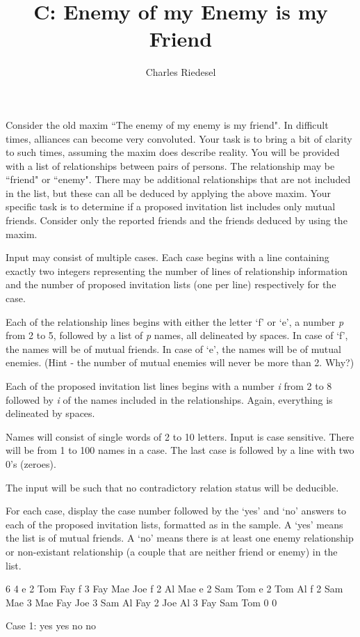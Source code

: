 \documentclass{article}
\title{C: Enemy of my Enemy is my Friend}
\author{Charles Riedesel}
\begin{document}
\begin{problemDescription}
Consider the old maxim ``The enemy of my enemy is my friend".  In difficult times,
alliances can become very convoluted.  Your task is to bring a bit of clarity to
such times, assuming the maxim does describe reality.  You will be provided with
a list of relationships between pairs of persons.  The relationship may be ``friend"
or ``enemy".  There may be additional relationships that are not included in
the list, but these can all be deduced by applying the above maxim.  Your specific
task is to determine if a proposed invitation list includes only mutual friends.
Consider only the reported friends and the friends deduced by using the maxim.
\end{problemDescription}

\begin{inputDescription}
Input may consist of multiple cases.  Each case begins with a line containing 
exactly two integers representing the number of lines of relationship information 
and the number of proposed invitation lists (one per line) respectively for the case.  

Each of the relationship lines begins with either the letter `f' or `e', a number {\em p} 
from 2 to 5, followed by a list of {\em p} names, all delineated by spaces.  In 
case of `f', the names will be of mutual friends.  In case of `e', the names will 
be of mutual enemies.  (Hint - the number of mutual enemies will never be more 
than 2.  Why?)

Each of the proposed invitation list lines begins with a number {\em i} from 2 to 8
followed by {\em i} of the names included in the relationships.
Again, everything is delineated by spaces.

Names will consist of single words of 2 to 10 letters.  Input is case sensitive.
There will be from 1 to 100 names in a case.  The last case is followed by a line
with two 0's (zeroes).

The input will be such that no contradictory relation status will be deducible.
\end{inputDescription}

\begin{outputDescription}
For each case, display the case number followed by the `yes' and `no' answers to 
each of the proposed invitation lists, formatted as in the sample.  A `yes' means
the list is of mutual friends.  A `no' means there is at least one enemy 
relationship or non-existant relationship (a couple that are neither friend or
enemy) in the list.
\end{outputDescription}

\begin{sampleInput}
6  4
e  2  Tom  Fay
f  3  Fay  Mae  Joe
f  2  Al  Mae
e  2  Sam  Tom
e  2  Tom  Al
f  2  Sam  Mae
3  Mae  Fay  Joe
3  Sam  Al  Fay
2  Joe  Al
3  Fay  Sam  Tom
0  0
\end{sampleInput}
\begin{sampleOutput}
Case 1: yes yes no no
\end{sampleOutput}
\end{document}
